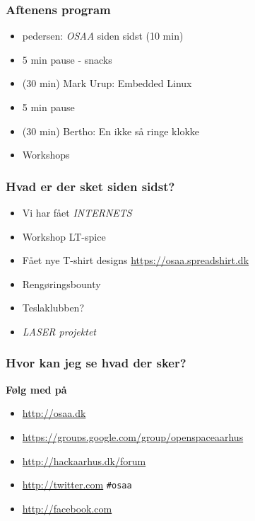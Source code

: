 \documentclass{beamer}
\begin{document}
\begin{frame}
  \frametitle{Aftenens program}
  \begin{itemize}
  \item pedersen: \emph{OSAA} siden sidst (10 min)
  \item 5 min pause - snacks
  \item  (30 min) Mark Urup: Embedded Linux 
  \item 5 min pause
  \item  (30 min) Bertho: En ikke så ringe klokke
  \item Workshops

  \end{itemize}						
\end{frame}

\begin{frame}
  \frametitle{Hvad er der sket siden sidst?}
  \begin{itemize}

  \item Vi har fået \emph{INTERNETS}
  \item Workshop LT-spice
  \item Fået nye T-shirt designs \url{https://osaa.spreadshirt.dk}
  \item Rengøringsbounty
  \item Teslaklubben?   
  \item \emph{LASER projektet}  
  \end{itemize}						
\end{frame}


\begin{frame}
  \frametitle{Hvor kan jeg se hvad der sker?}
  \textbf{Følg med på}
  \begin{itemize}
  \item  \url{http://osaa.dk}
  \item  \url{https://groups.google.com/group/openspaceaarhus}
  \item  \url{http://hackaarhus.dk/forum}
  \item  \url{http://twitter.com} \texttt{\#osaa}
  \item  \url{http://facebook.com} 
  \end{itemize}						
\end{frame}
\end{document}
